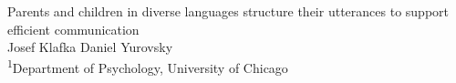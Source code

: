 \documentclass[article,30pt,extrafontsizes]{memoir}
\begin{document}
\begin{topbox}
  \color{titletextcol}
  \vspace{0.5in}
  \Huge{\selectfont Parents and children in diverse languages
structure their utterances to support efficient communication}  \\[0.3in]  %
  \color{authortextcol} \Large{Josef Klafka Daniel Yurovsky} \\[0.2in] %
  \color{affiliationtextcol} \large{\textsuperscript{1}Department of Psychology, University of Chicago} %
  \vspace{1cm}
\end{topbox}
\end{document}
